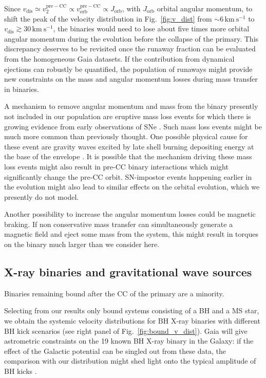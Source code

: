 \documentclass{aa}
\DeclareRobustCommand{\Figref}[1]{Fig.~\ref{#1}}
\begin{document}
Since
$v_\mathrm{dis}\simeq v_2^\mathrm{pre-CC}\propto
v_\mathrm{orb}^\mathrm{pre-CC}\propto J_\mathrm{orb}$, with
$J_\mathrm{orb}$ orbital angular momentum, to shift the
peak of the velocity distribution in \Figref{fig:v_dist} from
$\sim$$6\,\mathrm{km\ s^{-1}}$ to
$v_\mathrm{dis}\gtrsim30\,\mathrm{km\ s^{-1}}$, the binaries would
need to lose about five times more orbital angular momentum during the evolution
before the collapse of the primary. This discrepancy
deserves to be revisited once the runaway fraction can be evaluated from the
homogeneous Gaia datasets. If the contribution from
dynamical ejections can robustly be quantified, the 
population of runaways might provide new constraints on the mass
and angular momentum losses during mass transfer in
binaries.

A mechanism to remove angular momentum and mass from the
binary presently not included in our population are eruptive mass loss
events for which there is growing evidence from early observations of
SNe \citep[e.g.][]{khazov:16}. Such mass loss events might be much
more common than previously thought. One possible physical cause for
these event are gravity waves
excited by late shell burning depositing energy at the base of the
envelope \citep[][]{quataert:12, fuller:17, fuller:18}. It is possible
that the mechanism driving these mass loss events might also result in
pre-CC binary interactions which might significantly change the pre-CC
orbit. SN-impostor events happening earlier in the evolution might
also lead to similar effects on the orbital evolution, which we
presently do not model.

Another possibility to increase the angular momentum losses could be
magnetic braking. If non conservative mass transfer can simultaneously
generate a magnetic field and eject some mass from the system, this
might result in torques on the binary much larger than we consider here. 

\subsection{X-ray binaries and gravitational wave sources}

Binaries remaining bound after the CC of the primary are a minority.

Selecting from our results only bound systems consisting of a BH and a
MS star, we obtain the systemic velocity distributions for BH X-ray
binaries with different BH kick scenarios (see right panel of
\Figref{fig:bound_v_dist}). Gaia will give astrometric constraints on the 19 known BH X-ray binary in the Galaxy: if the
effect of the Galactic potential can be singled out from these data,
the comparison with our distribution might shed light onto the typical
amplitude of BH kicks \citep[e.g.,][]{fragos:09,repetto:12,Fragos+2013a,mandel:16}.
\end{document}
